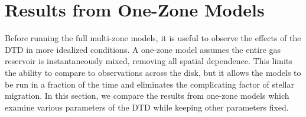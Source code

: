 \documentclass[twocolumn,twocolappendix,linenumbers,trackchanges]{aastex631}
\begin{document}
\section{Results from One-Zone Models}
\label{sec:onezone-results}


Before running the full multi-zone models, it is useful to observe the effects of the DTD in more idealized conditions. A one-zone model assumes the entire gas reservoir is instantaneously mixed, removing all spatial dependence. This limits the ability to compare to observations across the disk, but it allows the models to be run in a fraction of the time and eliminates the complicating factor of stellar migration. In this section, we compare the results from one-zone models which examine various parameters of the DTD while keeping other parameters fixed.
\end{document}

